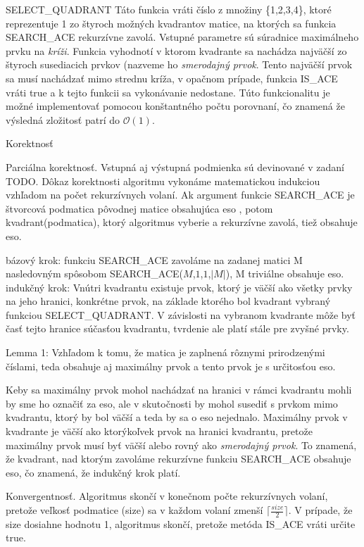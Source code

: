 \documentclass[paper=a4, fontsize=11pt]{scrartcl} %
\numberwithin{equation}{section} %
\numberwithin{figure}{section} %
\numberwithin{table}{section} %
\begin{document}
SELECT\_QUADRANT
Táto funkcia vráti číslo z množiny \{1,2,3,4\}, ktoré reprezentuje 1 zo štyroch možných kvadrantov matice, na ktorých sa funkcia SEARCH\_ACE rekurzívne zavolá. Vstupné parametre sú súradnice maximálneho prvku na {\em kríži}. Funkcia vyhodnotí v ktorom kvadrante sa nachádza najväčší zo štyroch susediacich prvkov (nazveme ho {\em smerodajný prvok}. Tento najväčší prvok sa musí nachádzať mimo strednu kríža, v opačnom prípade, funkcia IS\_ACE vráti true a k tejto funkcii sa vykonávanie nedostane. Túto funkcionalitu je možné implementovať pomocou konštantného počtu porovnaní, čo znamená že výsledná zložitosť patrí do $\mathcal{O}(1)$.





Korektnosť

Parciálna korektnosť.
Vstupná aj výstupná podmienka sú devinované v zadaní TODO.
Dôkaz korektnosti algoritmu vykonáme matematickou indukciou vzhľadom na počet rekurzívnych volaní.
Ak argument funkcie SEARCH\_ACE je štvorcová podmatica pôvodnej matice obsahujúca eso , potom kvadrant(podmatica), ktorý algoritmus vyberie a rekurzívne zavolá, tiež obsahuje eso.

bázový krok: funkciu SEARCH\_ACE zavoláme na zadanej matici M nasledovným spôsobom SEARCH\_ACE($M$,$1$,$1$,$|M|$), M triviálne obsahuje eso.
indukčný krok: 
Vnútri kvadrantu existuje prvok, ktorý je väčší ako všetky prvky na jeho hranici, konkrétne prvok, na základe ktorého bol kvadrant vybraný funkciou SELECT\_QUADRANT. V závislosti na vybranom kvadrante môže byť časť tejto hranice súčasťou kvadrantu, tvrdenie ale platí stále pre zvyšné prvky. 

Lemma 1: Vzhľadom k tomu, že matica je zaplnená rôznymi prirodzenými číslami, teda obsahuje aj maximálny prvok a tento prvok je s určitosťou eso.

Keby sa maximálny prvok mohol nachádzať na hranici v rámci kvadrantu mohli by sme ho označiť za eso, ale v skutočnosti by mohol susediť s prvkom mimo kvadrantu, ktorý by bol väčší a teda by sa o eso nejednalo. Maximálny prvok v kvadrante je väčší ako ktorýkoľvek prvok na hranici kvadrantu, pretože maximálny prvok musí byť väčší alebo rovný ako {\em smerodajný prvok}. To znamená, že kvadrant, nad ktorým zavoláme rekurzívne funkciu SEARCH\_ACE obsahuje eso, čo znamená, že indukčný krok platí.

Konvergentnosť.
Algoritmus skončí v konečnom počte rekurzívnych volaní, pretože veľkosť podmatice (size) sa v každom volaní zmenší $\lceil \frac{size}{2} \rceil$. V prípade, že size dosiahne hodnotu 1, algoritmus skončí, pretože metóda IS\_ACE vráti určite true.
\end{document}

